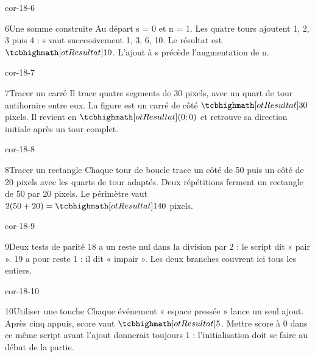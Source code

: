 \begin{blocLivre}{cor-18-6}\begin{corrige}{6}{Une somme construite}
Au départ s = 0 et n = 1. Les quatre tours ajoutent 1, 2, 3 puis 4 : s vaut successivement 1, 3, 6, 10. Le résultat est $\res{10}$. L’ajout à s précède l’augmentation de n.
\label{fig-cor-18-6}
\end{corrige}\end{blocLivre}
\begin{blocLivre}{cor-18-7}\begin{corrige}{7}{Tracer un carré}
Il trace quatre segments de 30 pixels, avec un quart de tour antihoraire entre eux. La figure est un carré de côté $\res{30}$ pixels. Il revient en $\res{(0;0)}$ et retrouve sa direction initiale après un tour complet.
\label{fig-cor-18-7}
\end{corrige}\end{blocLivre}
\begin{blocLivre}{cor-18-8}\begin{corrige}{8}{Tracer un rectangle}
Chaque tour de boucle trace un côté de 50 puis un côté de 20 pixels avec les quarts de tour adaptés. Deux répétitions ferment un rectangle de 50 par 20 pixels. Le périmètre vaut $2(50+20)=\res{140}$ pixels.
\label{fig-cor-18-8}
\end{corrige}\end{blocLivre}
\begin{blocLivre}{cor-18-9}\begin{corrige}{9}{Deux tests de parité}
18 a un reste nul dans la division par 2 : le script dit « pair ». 19 a pour reste 1 : il dit « impair ». Les deux branches couvrent ici tous les entiers.
\label{fig-cor-18-9}
\end{corrige}\end{blocLivre}
\begin{blocLivre}{cor-18-10}\begin{corrige}{10}{Utiliser une touche}
Chaque événement « espace pressée » lance un seul ajout. Après cinq appuis, score vaut $\res5$. Mettre score à 0 dans ce même script avant l’ajout donnerait toujours 1 : l’initialisation doit se faire au début de la partie.
\label{fig-cor-18-10}
\end{corrige}\end{blocLivre}
